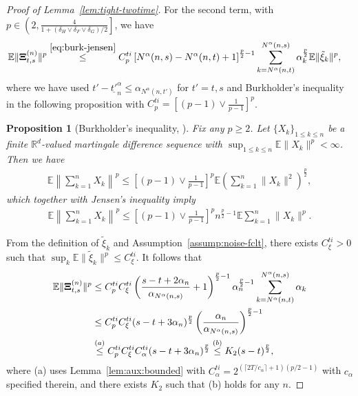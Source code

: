 \documentclass[11pt]{article}
\theoremstyle{plain}
\newtheorem{prop}{Proposition}[section]
\theoremstyle{definition}
\def\Hsmooth{{\delta_H}}
\def\Fsmooth{{\delta_F}}
\def\Gsmooth{{\delta_G}}
\def\cti{C^{ti}}
\def\eps{{\varepsilon}}
\def\RB{{\mathbb R}}
\def\EB{{\mathbb E}}
\newcommand{\ssum}[3]{\sum\limits_{{#1}={#2}}^{#3}}
\def\Xii{\mbox{\boldmath$\Xi$\unboldmath}}
\begin{document}
\begin{appendix}
\begin{proof}[Proof of Lemma~\ref{lem:tight-twotime}]
For the second term, 
with $p \in \left(2, \frac{4}{1 + ( \Hsmooth \vee \Fsmooth \vee \Gsmooth )/2} \right]$,
we have
\begin{align*}
    \EB \| \Xii^{(n)}_{t,s} \|^p
    & \overset{\eqref{eq:burk-jensen}}{\le}  \cti_p \left[ N^\alpha(n, s) - N^\alpha(n,t) + 1 \right]^{\frac{p}{2}-1} \ssum{k}{ N^\alpha(n,t) }{N^\alpha(n,s) } \alpha_{k}^\frac{p}{2} \EB \| \tilde{\xi}_{k} \|^p,
\end{align*}
where we have used $t' - \underline{t'}^\alpha_{n} \le \alpha_{N^\alpha(n,t')}$ for $t'=t,s$ and Burkholder's inequality in the following proposition with $\cti_p = \left[ (p-1) \vee \frac{1}{p-1} \right]^p$.

\begin{prop}[Burkholder's inequality, {\cite{burkholder1988sharp}}]\label{prop:burk}
    Fix any $p \ge 2$.
    Let $\{ X_k \}_{1 \le k \le n}$ be a finite $\RB^d$-valued martingale difference sequence with $\sup_{1 \le k \le n} \EB \| X_k \|^p < \infty$. Then we have
    \begin{align*}
        \EB \left\| \ssum{k}{1}{n} X_k \right\|^p \le \left[ (p-1) \vee \frac{1}{p-1} \right]^p \EB \left( \ssum{k}{1}{n} \| X_k \|^2 \right)^\frac{p}{2},
    \end{align*}
    which together with Jensen's inequality imply 
    \begin{align}\label{eq:burk-jensen}
        \EB \left\| \ssum{k}{1}{n} X_k \right\|^p \le \left[ (p-1) \vee \frac{1}{p-1} \right]^p n^{\frac{p}{2} - 1 } \EB \ssum{k}{1}{n} \| X_k \|^p.
    \end{align}
\end{prop}

From the definition of $\tilde{\xi}_{k}$ and Assumption~\ref{assump:noise-fclt}, there exists $\cti_\xi > 0$ such that $\sup_{k} \EB \| \tilde{\xi}_{k} \|^p \le \cti_\xi $.
It follows that
\begin{align}
    \EB \| \Xii^{(n)}_{t,s} \|^p
    & \le \cti_p \cti_\xi \left( \frac{ s-t + 2\alpha_{n} }{ \alpha_{ N^\alpha(n, s) } }  + 1 \right)^{\frac{p}{2}-1}  \alpha_{n}^{ \frac{p}{2} - 1 } \ssum{k}{ N^\alpha(n,t) }{N^\alpha(n,s) } \alpha_{k} \nonumber \\
    & \le  \cti_p \cti_\xi ( s-t + 3 \alpha_{n} )^\frac{p}{2} \left( \frac{ \alpha_{n} }{ \alpha_{ N^\alpha(n, s) }  } \right)^{\frac{p}{2}-1 } \nonumber \\
    & \overset{ (a) }{\le} \cti_p \cti_\xi \cti_\alpha ( s-t + 3 \alpha_{n} )^\frac{p}{2}
    \overset{ (b) }{\le} K_2 ( s-t )^\frac{p}{2},
    \label{eq:lem:tight-twotime:xii}
\end{align}
where (a) uses Lemma~\ref{lem:aux:bounded} with $\cti_\alpha = 2^{ ( \lceil 2T/ c_\alpha \rceil + 1 )(p/2-1) }$ with $c_\alpha$ specified therein, 
and there exists $K_2$ such that (b) holds for any $n$.



\end{proof}
\end{appendix}
\end{document}

